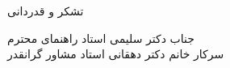 \clearpage
\thispagestyle{empty}

{\BZarScaleOne
{\fontsize{20pt}{0}\selectfont
\noindent
تشکر و قدردانی
}}
\vspace{0.5cm}

{\BZarScaleOne
{\fontsize{12pt}{0.9cm}\selectfont %
\noindent
جناب دکتر سلیمی استاد راهنمای محترم\\
سرکار خانم دکتر دهقانی استاد مشاور گرانقدر






}}

\restoregeometry